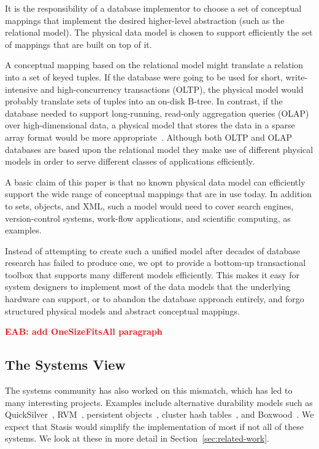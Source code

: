 \documentclass[letterpaper,twocolumn,10pt]{article}
\newcommand{\yad}{Stasis\xspace}
\newcommand{\eab}[1]{\textcolor{red}{\bf EAB: #1}}
\begin{document}

It is the responsibility of a database implementor to choose a set of
conceptual mappings that implement the desired higher-level
abstraction (such as the relational model).  The physical data model
is chosen to support efficiently the set of mappings that are built on
top of it.

A conceptual mapping based on the relational model might translate a
relation into a set of keyed tuples.  If the database were going to be
used for short, write-intensive and high-concurrency transactions
(OLTP), the physical model would probably translate sets of tuples
into an on-disk B-tree.  In contrast, if the database needed to
support long-running, read-only aggregation queries (OLAP) over high-dimensional data, a physical model that stores the data in a sparse
array format would be more appropriate~\cite{OLAP,molap}.  Although both
OLTP and OLAP databases are based upon the relational model they make
use of different physical models in order to serve
different classes of applications efficiently.

A basic claim of
this paper is that no known physical data model can efficiently
support the wide range of conceptual mappings that are in use today.
In addition to sets, objects, and XML, such a model would need
to cover search engines, version-control systems, work-flow
applications, and scientific computing, as examples.

Instead of attempting to create such a unified model after decades of
database research has failed to produce one, we opt to provide a
bottom-up transactional toolbox that supports many different models
efficiently.  This makes it easy for system designers to
implement most of the data models that the underlying hardware can
support, or to abandon the database approach entirely, and forgo 
structured physical models and abstract conceptual mappings.

\eab{add OneSizeFitsAll paragraph}


\subsection{The Systems View}
\label{sec:systems}
The systems community has also worked on this mismatch,
which has led to many interesting projects.  Examples include
alternative durability models such as QuickSilver~\cite{experienceWithQuickSilver},
RVM~\cite{lrvm}, persistent objects~\cite{argus}, 
cluster hash tables~\cite{DDS}, and Boxwood~\cite{boxwood}.  We expect that \yad would simplify
the implementation of most if not all of these systems.  We look at
these in more detail in Section~\ref{sec:related-work}.
\end{document}
